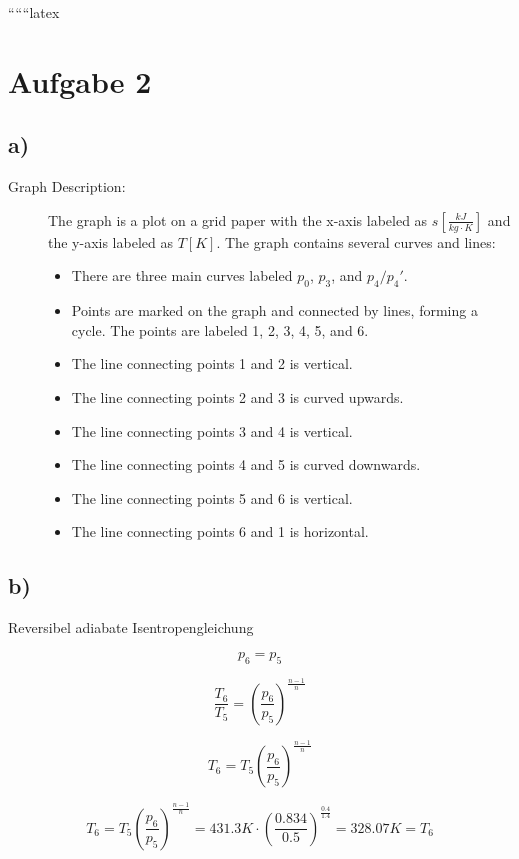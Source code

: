 
``````latex


\section*{Aufgabe 2}

\subsection*{a)}

\begin{description}
    \item[Graph Description:] The graph is a plot on a grid paper with the x-axis labeled as \( s \left[ \frac{kJ}{kg \cdot K} \right] \) and the y-axis labeled as \( T [K] \). The graph contains several curves and lines:
    \begin{itemize}
        \item There are three main curves labeled \( p_0 \), \( p_3 \), and \( p_4/p_4' \).
        \item Points are marked on the graph and connected by lines, forming a cycle. The points are labeled 1, 2, 3, 4, 5, and 6.
        \item The line connecting points 1 and 2 is vertical.
        \item The line connecting points 2 and 3 is curved upwards.
        \item The line connecting points 3 and 4 is vertical.
        \item The line connecting points 4 and 5 is curved downwards.
        \item The line connecting points 5 and 6 is vertical.
        \item The line connecting points 6 and 1 is horizontal.
    \end{itemize}
\end{description}

\subsection*{b)}

Reversibel adiabate Isentropengleichung

\[
p_6 = p_5
\]

\[
\frac{T_6}{T_5} = \left( \frac{p_6}{p_5} \right)^{\frac{n-1}{n}}
\]

\[
T_6 = T_5 \left( \frac{p_6}{p_5} \right)^{\frac{n-1}{n}}
\]

\[
T_6 = T_5 \left( \frac{p_6}{p_5} \right)^{\frac{n-1}{n}} = 431.3 K \cdot \left( \frac{0.834}{0.5} \right)^{\frac{0.4}{1.4}} = 328.07 K = T_6
\]

